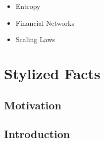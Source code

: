 \documentclass[]{book}
\providecommand{\tightlist}{%
  \setlength{\itemsep}{0pt}\setlength{\parskip}{0pt}}
\begin{document}
\begin{itemize}
\tightlist
\item
  Entropy
\item
  Financial Networks
\item
  Scaling Laws
\end{itemize}

\chapter{Stylized Facts}\label{stylized-facts}

\section{Motivation}\label{motivation}

\section{Introduction}\label{introduction}


\end{document}
